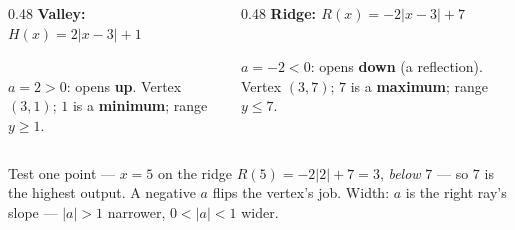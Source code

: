 \documentclass[aspectratio=169, 11pt]{beamer}
\newcommand{\lgrid}[4]{%
  \draw[step=1, linegray!40, very thin] (#1,#3) grid (#2,#4);
  \draw[->, thick, charcoal] (#1,0)--(#2,0) node[below right, font=\tiny]{$x$};
  \draw[->, thick, charcoal] (0,#3)--(0,#4) node[left, font=\tiny]{$y$};}
\begin{document}
\begin{frame}[t, plain]
  \begin{columns}[T]
    \begin{column}{0.48\textwidth}
      \textbf{Valley: $H(x)=2|x-3|+1$} \\[2pt]
      \centering
       \\[2pt]
      $a=2>0$: opens \textbf{up}. Vertex $(3,1)$; $1$ is a \textbf{minimum}; range $y\ge1$.
    \end{column}
    \begin{column}{0.48\textwidth}
      \textbf{Ridge: $R(x)=-2|x-3|+7$} \\[2pt]
      \centering
       \\[2pt]
      $a=-2<0$: opens \textbf{down} (a reflection). Vertex $(3,7)$; $7$ is a \textbf{maximum};
      range $y\le7$.
    \end{column}
  \end{columns}
  \vspace{3pt}
  \begin{block}{Test one point --- $x=5$ on the ridge}
    $R(5)=-2|2|+7=3$, \emph{below} $7$ --- so $7$ is the highest output. A negative $a$ flips the
    vertex's job. Width: $a$ is the right ray's slope --- $|a|>1$ narrower, $0<|a|<1$ wider.
  \end{block}
\end{frame}
\end{document}
